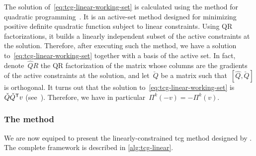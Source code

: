 The solution of~\cref{eq:tcg-linear-working-set} is calculated using the \citeauthor{Goldfarb_Idnani_1983} method for quadratic programming~\cite{Goldfarb_Idnani_1983}.
It is an active-set method designed for minimizing positive definite quadratic function subject to linear constraints.
Using QR factorizations, it builds a linearly independent subset of the active constraints at the solution.
Therefore, after executing such the \citeauthor{Goldfarb_Idnani_1983} method, we have a solution to~\cref{eq:tcg-linear-working-set} together with a basis of the active set.
In fact, denote~$\hat{Q}R$ the QR factorization of the matrix whose columns are the gradients of the active constraints at the solution, and let~$\check{Q}$ be a matrix such that~$[\hat{Q}, \check{Q}]$ is orthogonal.
It turns out that the solution to~\cref{eq:tcg-linear-working-set} is~$\check{Q} \check{Q}^{\mathsf{T}} v$ (see~\cite[Eq.~(3.7)]{Powell_2015}).
Therefore, we have in particular~$\Pi^k(-v) = -\Pi^k(v)$.

\subsubsection{The  method}

We are now equiped to present the linearly-constrained \gls{tcg} method designed by \citeauthor{Powell_2015}.
The complete framework is described in \cref{alg:tcg-linear}.

